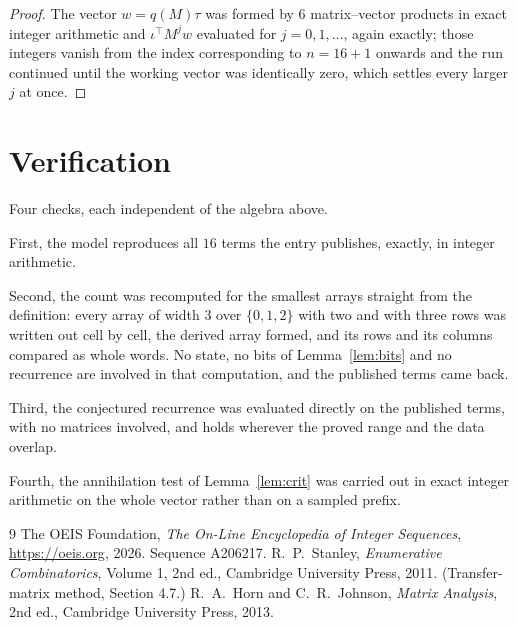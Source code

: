 \documentclass[11pt,a4paper]{article}
\theoremstyle{plain}
\theoremstyle{definition}
\begin{document}
\begin{proof}
The vector $w=q(M)\tau$ was formed by $6$ matrix--vector products in exact integer
arithmetic and $\iota^{\!\top}M^{j}w$ evaluated for $j=0,1,\dots$, again exactly; those
integers vanish from the index corresponding to $n=16+1$ onwards and the run continued
until the working vector was identically zero, which settles every larger $j$ at once.
\end{proof}

\section{Verification}

Four checks, each independent of the algebra above.

First, the model reproduces all $16$ terms the entry publishes, exactly, in integer
arithmetic.

Second, the count was recomputed for the smallest arrays straight from the definition: every
array of width $3$ over $\{0,1,2\}$ with two and with three rows was written out cell by cell,
the derived array formed, and its rows and its columns compared as whole words. No state, no
bits of Lemma~\ref{lem:bits} and no recurrence are involved in that computation, and the
published terms came back.

Third, the conjectured recurrence was evaluated directly on the published terms, with no
matrices involved, and holds wherever the proved range and the data overlap.

Fourth, the annihilation test of Lemma~\ref{lem:crit} was carried out in exact integer
arithmetic on the whole vector rather than on a sampled prefix.

\begin{thebibliography}{9}
 The OEIS Foundation, \emph{The On-Line Encyclopedia of Integer
Sequences}, \url{https://oeis.org}, 2026. Sequence A206217.
 R.~P.~Stanley, \emph{Enumerative Combinatorics}, Volume 1, 2nd ed.,
Cambridge University Press, 2011. (Transfer-matrix method, Section 4.7.)
 R.~A.~Horn and C.~R.~Johnson, \emph{Matrix Analysis}, 2nd ed., Cambridge
University Press, 2013.
\end{thebibliography}
\end{document}
